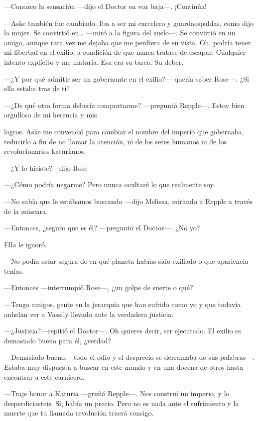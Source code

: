 {---Conozco la sensación ---dijo el Doctor en voz baja---. ¡Continúa!}

{---Aske también fue cambiado. Iba a ser mi carcelero y guardaespaldas,
	como dijo la mujer. Se convirtió en\ldots{} ---miró a la figura del
	suelo---. Se convirtió en un amigo, aunque rara vez me dejaba que me
	perdiera de su vista. Oh, podría tener mi libertad en el exilio, a
	condición de que nunca tratase de escapar. Cualquier intento explícito y
me mataría. Esa era su tarea. Su deber.}

{---¿Y por qué admitir ser un gobernante en el exilio? ---quería saber
Rose---. ¿Si ella estaba tras de ti?}

{---¿De qué otra forma debería comportarme? ---preguntó Repple---. Estoy
bien orgulloso de mi herencia y mis}

{logros. Aske me convenció para cambiar el nombre del imperio que
	gobernaba, reducirlo a fin de no llamar la atención, ni de los seres
humanos ni de los revolucionarios katurianos. }

{---¿Y lo hiciste?---dijo Rose}

{---¿Cómo podría negarme? Pero nunca ocultaré lo que realmente soy.}

{---No sabía que le estábamos buscando ---dijo Melissa, mirando a Repple
a través de la máscara.}

{---Entonces, ¿seguro que es él? ---preguntó el Doctor---. ¿No yo?}

{Ella le ignoró.}

{---No podía estar segura de en qué planeta habías sido exiliado o que
apariencia tenías.}

{---Entonces ---interrumpió Rose---, ¿un golpe de suerte o qué?}

{---Tengo amigos, gente en la jerarquía que han sufrido como yo y que
todavía anhelan ver a Vassily llevado ante la verdadera justicia.}

{---¿Justicia?---repitió el Doctor---. Oh quieres decir, ser ejecutado.
El exilio es demasiado bueno para él, ¿verdad?}

{---Demasiado bueno.---todo el odio y el desprecio se derramaba de sus
	palabras---. Estaba muy dispuesta a buscar en este mundo y en una docena
de otros hasta encontrar a este carnicero.}

{---Traje honor a Katuria ---gruñó Repple---. Nos construí un imperio, y
	lo desperdiciasteis. Sí, había un precio. Pero no es nada ante el
sufrimiento y la muerte que tu llamada revolución traerá consigo.}

